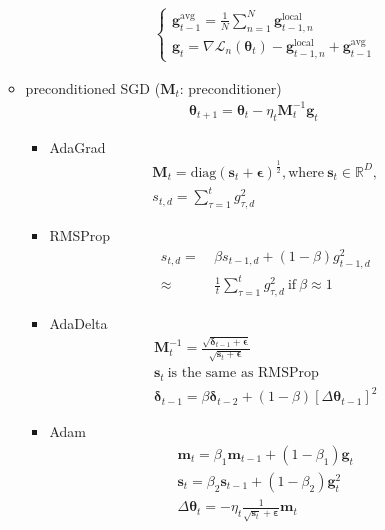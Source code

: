 \begin{itemize}
\begin{itemize}
\begin{itemize}
\begin{gather}
\begin{cases}
                \bm{g}_{t-1}^\text{avg}=\frac{1}{N}\sum_{n=1}^N\bm{g}_{t-1,n}^\text{local}\\
                \bm{g}_t=\nabla\mathcal{L}_n(\bm{\theta}_t)-\bm{g}_{t-1,n}^\text{local}+\bm{g}_{t-1}^\text{avg}
            \end{cases}
            \end{gather}
        \end{itemize}
        \item preconditioned SGD ($\mathbf{M}_t$: preconditioner) 
        \begin{gather}
            \bm{\theta}_{t+1}=\bm{\theta}_t-\eta_t\mathbf{M}_t^{-1}\bm{g}_t
        \end{gather}
        \begin{itemize}
            \item AdaGrad
            \begin{gather}
                \mathbf{M}_t=\mathrm{diag}(\bm{s}_t+\bm{\epsilon})^\frac{1}{2},\text{where}~\bm{s}_t\in\mathbb{R}^D,\\
                s_{t,d}=\sum_{\tau=1}^t g_{\tau,d}^2
            \end{gather}
            \item RMSProp
            \begin{align}
                s_{t,d}
                =&~ \beta s_{t-1,d}+(1-\beta)g_{t-1,d}^2\\
                \approx&~ \frac{1}{t}\sum_{\tau=1}^t g_{\tau,d}^2~\text{if}~\beta\approx 1
            \end{align}
            \item AdaDelta
            \begin{gather}
                \mathbf{M}_t^{-1}=\frac{\sqrt{\bm{\delta}_{t-1}+\bm{\epsilon}}}{\sqrt{\bm{s}_t+\bm{\epsilon}}}\\
                \bm{s}_t~\text{is the same as RMSProp}\\
                \bm{\delta}_{t-1}=\beta\bm{\delta}_{t-2}+(1-\beta)[\Delta \bm{\theta}_{t-1}]^2
            \end{gather}
            \item Adam
            \begin{gather}
                \bm{m}_t=\beta_1\bm{m}_{t-1}+(1-\beta_1)\bm{g}_t\\
                \bm{s}_t=\beta_2\bm{s}_{t-1}+(1-\beta_2)\bm{g}_t^2\\
                \Delta\bm{\theta}_t=-\eta_t\frac{1}{\sqrt{\bm{s}_t}+\bm{\varepsilon}}\bm{m}_t
            \end{gather}
        \end{itemize}
    \end{itemize}
\end{itemize}



